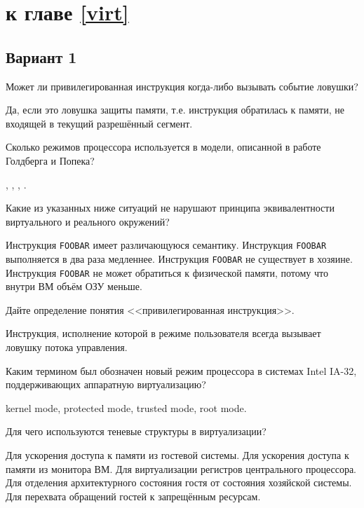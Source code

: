 \section{\Questions к главе \ref{virt}} %

\subsection*{Вариант 1}

\begin{questions}
\question[3] Может ли привилегированная инструкция когда-либо вызывать событие ловушки?
\begin{solution}[1cm]
Да, если это ловушка защиты памяти, т.е. инструкция обратилась к памяти, не входящей в текущий разрешённый сегмент.
\end{solution}

\question[1] Сколько режимов процессора используется в модели, описанной в работе Голдберга и Попека?
\begin{choices}
    ,
    ,
    ,
    .
\end{choices}

\question[3] Какие из указанных ниже ситуаций не нарушают принципа эквивалентности виртуального и реального окружений?
\begin{choices}
    \choice Инструкция \texttt{FOOBAR} имеет различающуюся семантику.
    \correctchoice Инструкция \texttt{FOOBAR} выполняется в два раза медленнее.
    \choice Инструкция \texttt{FOOBAR} не существует в хозяине.
    \correctchoice Инструкция \texttt{FOOBAR} не может обратиться к физической памяти, потому что внутри ВМ объём ОЗУ меньше.
\end{choices}

\question[3] Дайте определение понятия <<привилегированная инструкция>>.
\begin{solution}[1cm]
Инструкция, исполнение которой в режиме пользователя всегда вызывает ловушку потока управления.
\end{solution}

\question[3] Каким термином был обозначен новый режим процессора в системах Intel IA-32, поддерживающих аппаратную виртуализацию?
\begin{choices}
    \choice kernel mode,
    \choice protected mode,
    \choice trusted mode,
    \correctchoice root mode.
\end{choices}

\question[3] Для чего используются теневые структуры в виртуализации?
\begin{choices}
    \choice Для ускорения доступа к памяти из гостевой системы.
    \choice Для ускорения доступа к памяти из монитора ВМ.
    \choice Для виртуализации регистров центрального процессора.
    \correctchoice Для отделения архитектурного состояния гостя от состояния хозяйской системы.
    \choice Для перехвата обращений гостей к запрещённым ресурсам.
\end{choices}


\end{questions}


